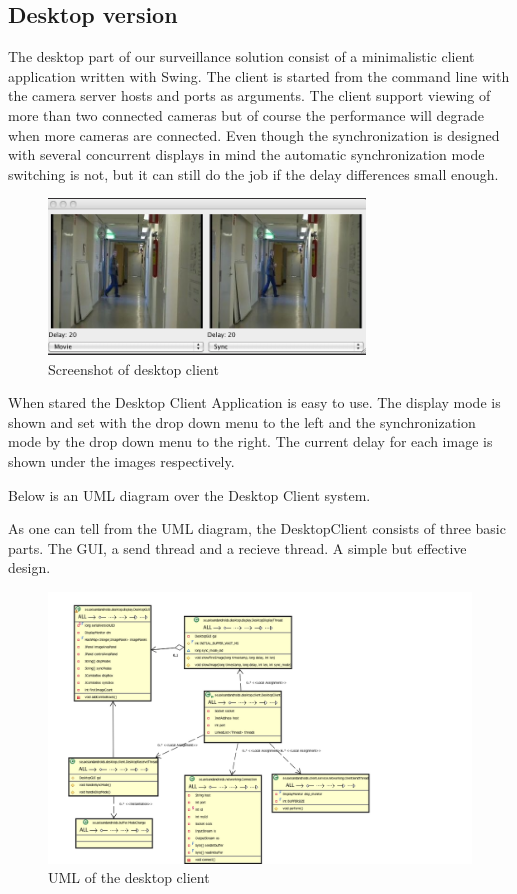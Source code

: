 \documentclass[8pt,titlepage]{article}
\begin{document}
\subsection{Desktop version}
The desktop part of our surveillance solution consist of a minimalistic client application written with Swing. The client is started from the command line with the camera server hosts and ports as arguments. The client support viewing of more than two connected cameras but of course the performance will degrade when more cameras are connected. Even though the synchronization is designed with several concurrent displays in mind the automatic synchronization mode switching is not, but it can still do the job if the delay differences small enough.

\begin{figure}[hbp]
\includegraphics[width=0.75\textwidth]{../screenshots/desktopclient.png}
\caption{Screenshot of desktop client}
\label{desktopclient}
\end{figure}

When stared the Desktop Client Application is easy to use. The display mode is shown and set with the drop down menu to the left and the synchronization mode by the drop down menu to the right. The current delay for each image is shown under the images respectively.

Below is an UML diagram over the Desktop Client system. 

As one can tell from the UML diagram, the DesktopClient consists of three basic parts. The GUI, a send thread and a recieve thread. A simple but effective design.

\clearpage
\begin{figure}[h!]
\includegraphics[width=2.0\textwidth]{../uml/desktop-client.png}
\caption{UML of the desktop client}
\end{figure}
\end{document}
